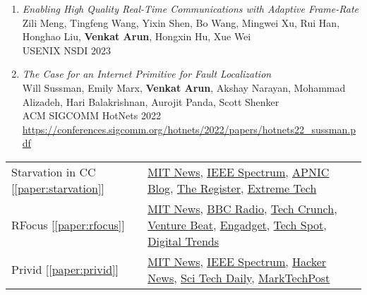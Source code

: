 \documentclass[notitlepage]{article}
\newcommand{\heading}[1]{\vspace{1em}{\large \MakeUppercase{\textrm{#1}}}

  \hrulefill
}
\begin{document}
\begin{enumerate}
\item {\it Enabling High Quality Real-Time Communications with Adaptive Frame-Rate}\\
  Zili Meng, Tingfeng Wang, Yixin Shen, Bo Wang, Mingwei Xu, Rui Han, Honghao Liu, {\bf Venkat Arun}, Hongxin Hu, Xue Wei\\
  USENIX NSDI 2023\\
\item {\it The Case for an Internet Primitive for Fault Localization}\\
  Will Sussman, Emily Marx, {\bf Venkat Arun}, Akshay Narayan, Mohammad Alizadeh, Hari Balakrishnan, Aurojit Panda, Scott Shenker\\
  ACM SIGCOMM HotNets 2022\\
  \url{https://conferences.sigcomm.org/hotnets/2022/papers/hotnets22_sussman.pdf}
\end{enumerate}

\heading{Selected Press Coverage}

\begin{tabular}{l l}
  Starvation in CC [\ref{paper:starvation}] &
  \href{https://news.mit.edu/2022/algorithm-computer-network-bandwidth-0804}{MIT News},
  \underline{\href{https://spectrum.ieee.org/internet-congestion-control}{IEEE Spectrum}},
  \underline{\href{https://blog.apnic.net/2022/11/23/congestion-control-algorithms-are-not-fair/}{APNIC Blog}},
  \href{https://www.theregister.com/2022/08/22/network_congestion_algorithms/?td=keepreading}{The Register},
  \href{https://www.extremetech.com/internet/338610-mit-researchers-say-all-network-congestion-algorithms-are-unfair}{Extreme Tech}\\
  RFocus [\ref{paper:rfocus}] &
  \href{https://news.mit.edu/2020/smart-surface-smart-devices-mit-csail-0203}{MIT News},
  \underline{\href{https://www.bbc.co.uk/programmes/p08271xg}{BBC Radio}},
  \href{https://techcrunch.com/2020/02/03/mits-rfocus-technology-could-turn-your-walls-into-antennas/}{Tech Crunch},
  \href{https://venturebeat.com/mobile/mit-csails-rfocus-boosts-wireless-signal-strength-by-a-factor-of-nearly-10/}{Venture Beat},
  \href{https://www.engadget.com/2020-02-03-mit-rfocus-smart-surface.html}{Engadget},
  \href{https://www.techspot.com/news/83869-mit-rfocus-smart-surface-uses-tiny-antennas-amplify.html}{Tech Spot},
  \href{https://www.digitaltrends.com/news/rfocus-smart-wallpaper-boosts-signal-strength/}{Digital Trends}\\
  Privid [\ref{paper:privid}] &
  \href{https://news.mit.edu/2022/privid-security-tool-guarantees-privacy-surveillance-footage-0328}{MIT News},
  \underline{\href{https://spectrum.ieee.org/surveillance-privacy}{IEEE Spectrum}},
  \href{https://thehackernews.com/2022/03/privid-privacy-preserving-surveillance.html}{Hacker News},
  \href{https://scitechdaily.com/security-tool-privid-guarantees-privacy-in-surveillance-footage/}{Sci Tech Daily},
  \href{https://www.marktechpost.com/2022/03/30/researchers-from-mit-csail-introduce-privid-an-ai-tool-build-on-differential-privacy-to-guarantee-privacy-in-video-footage-from-surveillance-cameras/}{MarkTechPost}

\end{tabular}
\end{document}
